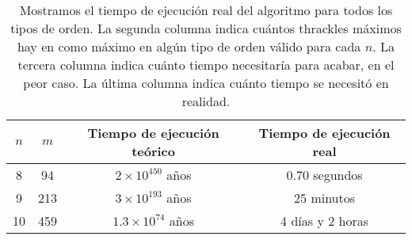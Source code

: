   \begin{table}
    \begin{tabular}{|c|c|c|c|}
      \hline
      $n$ & $m$ & Tiempo de ejecución teórico & Tiempo de ejecución real \\ \hline
      8   & 94  &  $2\times 10^{450}$ años    &  0.70 segundos           \\ \hline
      9   & 213 &  $3\times 10^{193}$ años    &  25 minutos               \\ \hline
      10  & 459 &  $1.3 \times 10^{74}$ años  &  4 días y 2 horas          \\ \hline
    \end{tabular}
    \caption{Mostramos el tiempo de ejecución real del algoritmo para todos los tipos de orden. La segunda columna indica cuántos thrackles máximos hay en como máximo en algún tipo de orden válido para cada $n$. La tercera columna indica cuánto tiempo necesitaría para acabar, en el peor caso. La última columna indica cuánto tiempo se necesitó en realidad.}
    \label{tabla:tiempo_colecciones_thrackles}
  \end{table}



